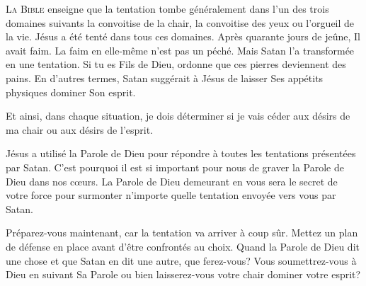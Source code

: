 





\lettrine[findent=-0.1em]{L}{a Bible} enseigne que la tentation  tombe généralement
 dans l'un des trois domaines suivants\frcolon{} la convoitise de la chair,
 la convoitise des yeux ou l'orgueil de la vie. Jésus a été tenté
 dans tous ces domaines. Après quarante jours de jeûne, Il avait faim.
 La faim en elle-même n'est pas un péché. Mais Satan l'a transformée
 en une tentation. \Og Si tu es Fils de Dieu, ordonne que ces pierres
 deviennent des pains. \Fg{} 
 En d'autres termes, Satan suggérait à Jésus de laisser
 Ses appétits physiques dominer Son esprit. 


Et ainsi, dans chaque situation, je dois déterminer si je vais céder
 aux désirs de ma chair ou aux désirs de l'esprit. 

Jésus a utilisé la Parole de Dieu pour répondre à toutes les tentations
 présentées par Satan. C'est pourquoi il est si important pour nous de graver
 la Parole de Dieu dans nos c\oe{}urs. La Parole de Dieu demeurant en vous
 sera le secret de votre force pour surmonter n'importe quelle tentation
 envoyée vers vous par Satan. 

Préparez-vous maintenant, car la tentation va arriver à coup sûr.
 Mettez un plan de défense en place avant d'être confrontés au choix.
 Quand la Parole de Dieu dit une chose et que Satan en dit une autre,
 que ferez-vous? Vous soumettrez-vous à Dieu en suivant Sa Parole
 ou bien laisserez-vous votre chair dominer votre esprit? 

\dvrule


